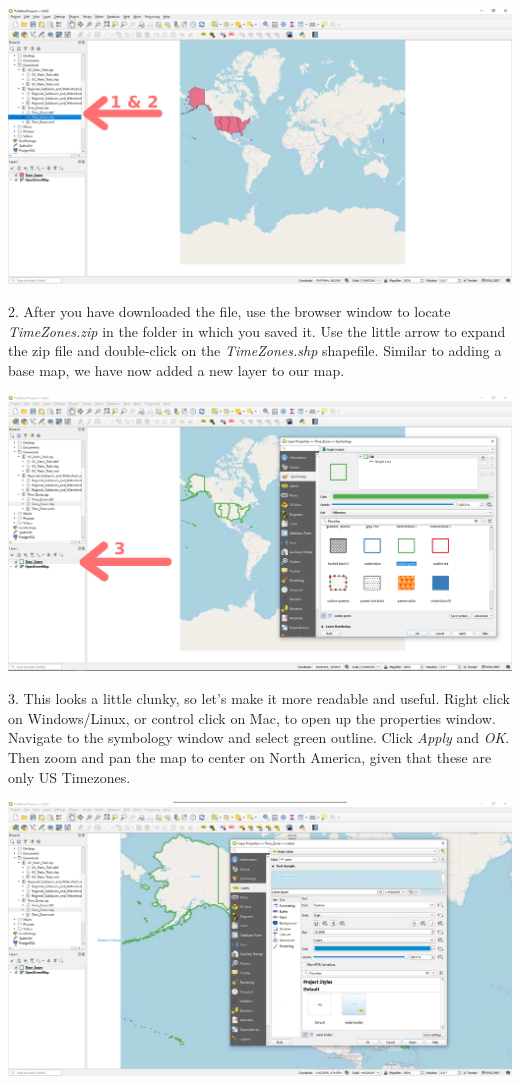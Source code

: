 \documentclass[oneside,a4paper,11pt,explicit]{book}
\begin{document}
\centerline{\includegraphics[width=\textwidth]{TimeZones.png}}

2. After you have downloaded the file, use the browser window to locate \textit{Time\textunderscore Zones.zip} in the folder in which you saved it. Use the little arrow to expand the zip file and double-click on the \textit{Time\textunderscore Zones.shp} shapefile. Similar to adding a base map, we have now added a new layer to our map.

\centerline{\includegraphics[width=\textwidth]{TimeZoneSymbol.png}}

3. This looks a little clunky, so let's make it more readable and useful. Right click on Windows/Linux, or control click on Mac, to open up the properties window. Navigate to the symbology window and select green outline. Click \textit{Apply} and \textit{OK}.  Then zoom and pan the map to center on North America, given that these are only US Timezones.

\centerline{\includegraphics[width=\textwidth]{TimeZoneLabels.png}}
\end{document}
